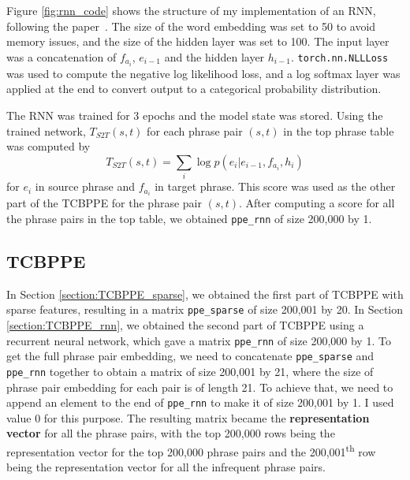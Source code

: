 \documentclass[12pt,a4paper,twoside]{report}
\begin{document}
Figure \ref{fig:rnn_code} shows the structure of my implementation of an RNN, following the paper~\cite{r2nn}. The size of the word embedding was set to 50 to avoid memory issues, and the size of the hidden layer was set to 100. The input layer was a concatenation of $f_{a_i}$, $e_{i-1}$ and the hidden layer $h_{i-1}$. \texttt{torch.nn.NLLLoss} was used to compute the negative log likelihood loss, and a log softmax layer was applied at the end to convert output to a categorical probability distribution.

The RNN was trained for 3 epochs and the model state was stored. Using the trained network, $T_{S2T}(s, t)$ for each phrase pair $(s, t)$ in the top phrase table was computed by
\[ T_{S2T}(s, t) = \sum_{i} \log p(e_i|e_{i-1}, f_{a_i}, h_i)\]
for $e_i$ in source phrase and $f_{a_i}$ in target phrase. This score was used as the other part of the TCBPPE for the phrase pair $(s, t)$. After computing a score for all the phrase pairs in the top table, we obtained \texttt{ppe\_rnn} of size 200,000 by 1.

\subsection{TCBPPE}\label{section:TCBPPE}
In Section \ref{section:TCBPPE_sparse}, we obtained the first part of TCBPPE with sparse features, resulting in a matrix \texttt{ppe\_sparse} of size 200,001 by 20. In Section \ref{section:TCBPPE_rnn}, we obtained the second part of TCBPPE using a recurrent neural network, which gave a matrix \texttt{ppe\_rnn} of size 200,000 by 1. To get the full phrase pair embedding, we need to concatenate \texttt{ppe\_sparse} and \texttt{ppe\_rnn} together to obtain a matrix of size 200,001 by 21, where the size of phrase pair embedding for each pair is of length 21. To achieve that, we need to append an element to the end of \texttt{ppe\_rnn} to make it of size 200,001 by 1. I used value 0 for this purpose. The resulting matrix became the \textbf{representation vector} for all the phrase pairs, with the top 200,000 rows being the representation vector for the top 200,000 phrase pairs and the 200,001\textsuperscript{th} row being the representation vector for all the infrequent phrase pairs.
\end{document}
